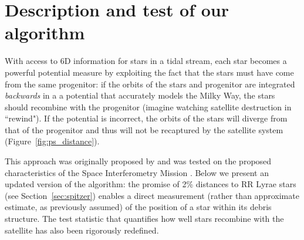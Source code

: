 \section{Description and test of our algorithm}
\label{sec:method}
With access to 6D information for stars in a tidal stream, each star becomes a
powerful potential measure by exploiting the fact that the stars must have come
from the same progenitor: if the orbits of the stars and progenitor are
integrated \emph{backwards} in a a potential that accurately models the Milky
Way, the stars should recombine with the progenitor (imagine watching satellite
destruction in ``rewind"). If the potential is incorrect, the orbits of the
stars will diverge from that of the progenitor and thus will not be recaptured
by the satellite system (Figure~\ref{fig:ps_distance}).

This approach was originally proposed by \citet{johnston99a} and was tested on
the proposed characteristics of the Space Interferometry Mission
\citep{unwin08}. Below we present an updated version of the algorithm: the
promise of 2\% distances to RR Lyrae stars (see Section~\ref{sec:spitzer})
enables a direct measurement (rather than approximate estimate, as previously
assumed) of the position of a star within its debris structure. The test
statistic that quantifies how well stars recombine with the satellite has also
been rigorously redefined.

